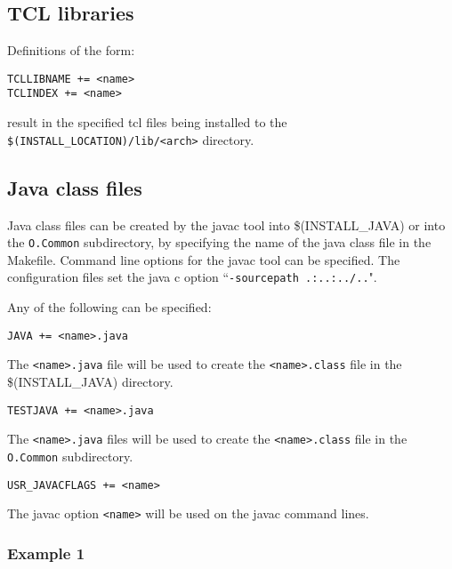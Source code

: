 \subsection{TCL libraries}

Definitions of the form:

\begin{verbatim}
TCLLIBNAME += <name>
TCLINDEX += <name>
\end{verbatim}

result in the specified tcl files being installed to the \verb|$(INSTALL_LOCATION)/lib/<arch>| directory.

\subsection{Java class files}

Java class files can be created by the javac tool into \$(INSTALL\_JAVA) or into the \verb|O.Common| subdirectory, by 
specifying the name of the java class file in the Makefile. Command line options for the javac tool can be specified. The 
configuration files set the java c option ``\verb|-sourcepath .:..:../..|".

Any of the following can be specified:

\begin{description}

\item {}\verb|JAVA += <name>.java|

The \verb|<name>.java| file will be used to create the \verb|<name>.class| file in the \$(INSTALL\_JAVA) directory.

\item {}\verb|TESTJAVA += <name>.java|

The \verb|<name>.java| files will be used to create the \verb|<name>.class| file in the \verb|O.Common| subdirectory.

\item {}\verb|USR_JAVACFLAGS += <name>|

The javac option \verb|<name>| will be used on the javac command lines.

\end{description}

\subsubsection{Example 1}

